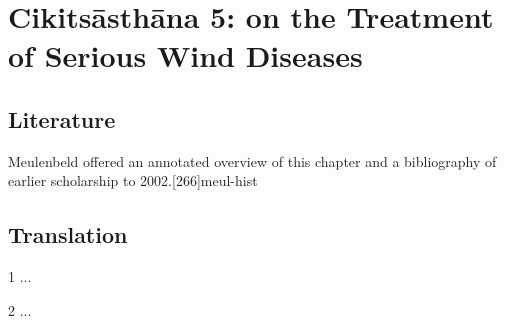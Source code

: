 
\chapter{Cikitsāsthāna 5:  on the Treatment of Serious Wind 
Diseases}

\section{Literature} 

Meulenbeld offered an annotated overview of this chapter and a bibliography
of earlier scholarship to 2002.[266]{meul-hist} 

\section{Translation}

\begin{translation}
    
    \item [1] ...
    
    \item [2] ...
    
\end{translation}